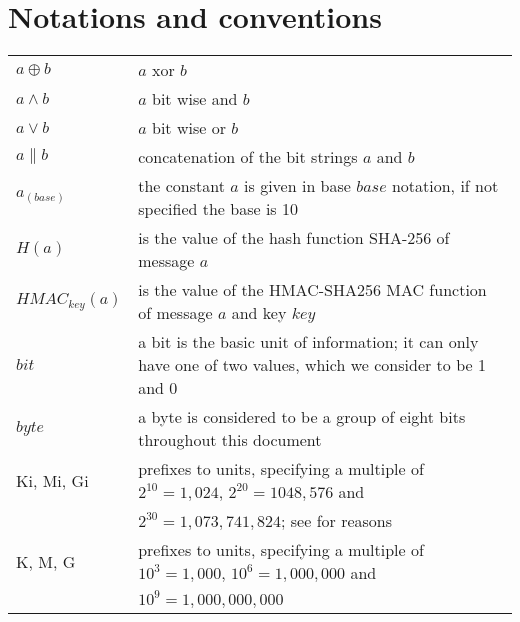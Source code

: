 \section{Notations and conventions}
\begin{tabular}{ll}
$a \oplus b$ & $a$ xor $b$ \\
$a \wedge b$ & $a$ bit wise and $b$ \\
$a \vee b$ & $a$ bit wise or $b$ \\
$a \parallel b$ & concatenation of the bit strings $a$ and $b$ \\
$a_{(base)}$ & the constant $a$ is given in base $base$ notation, if not specified the base is 10\\
$H(a)$ & is the value of the hash function SHA-256 of message $a$ \\
$HMAC_{key}(a)$ & is the value of the HMAC-SHA256 MAC function of message $a$ and key $key$ \\
$bit$ & a bit is the basic unit of information; it can only have one of two values, which we consider to be 1 and 0 \\
$byte$ & a byte is considered to be a group of eight bits throughout this document \\
Ki, Mi, Gi & prefixes to units, specifying a multiple of $2^{10} = 1,024$, $2^{20} = 1048,576$ and\\ & $2^{30} = 1,073,741,824$; see \cite{IEC60027-2} for reasons \\
K, M, G & prefixes to units, specifying a multiple of $10^3 = 1,000$, $10^6 = 1,000,000$ and\\ & $10^9=1,000,000,000$ \\ 
\end{tabular}